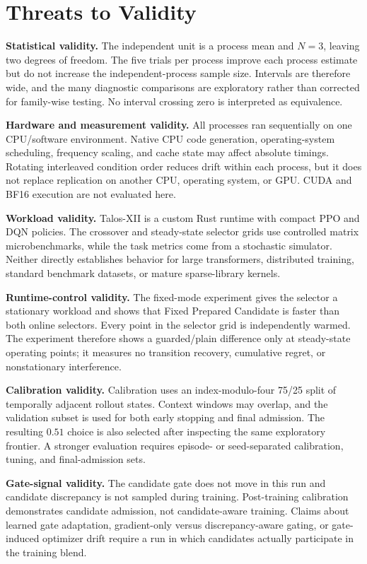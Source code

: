 \documentclass{article}
\begin{document}
\section{Threats to Validity}

\textbf{Statistical validity.}
The independent unit is a process mean and $N=3$, leaving two degrees of
freedom. The five trials per process improve each process estimate but do not
increase the independent-process sample size. Intervals are therefore wide,
and the many diagnostic comparisons are exploratory rather than corrected for
family-wise testing. No interval crossing zero is interpreted as equivalence.

\textbf{Hardware and measurement validity.}
All processes ran sequentially on one CPU/software environment. Native CPU
code generation, operating-system scheduling, frequency scaling, and cache
state may affect absolute timings. Rotating interleaved condition order reduces
drift within each process, but it does not replace replication on another CPU,
operating system, or GPU. CUDA and BF16 execution are not evaluated here.

\textbf{Workload validity.}
Talos-XII is a custom Rust runtime with compact PPO and DQN policies. The
crossover and steady-state selector grids use controlled matrix
microbenchmarks, while the
task metrics come from a stochastic simulator. Neither directly establishes
behavior for large transformers, distributed training, standard benchmark
datasets, or mature sparse-library kernels.

\textbf{Runtime-control validity.}
The fixed-mode experiment gives the selector a stationary workload and shows
that Fixed Prepared Candidate is faster than both online selectors. Every point
in the selector grid is independently warmed. The experiment therefore shows a
guarded/plain difference only at steady-state operating points; it measures no
transition recovery, cumulative regret, or nonstationary interference.

\textbf{Calibration validity.}
Calibration uses an index-modulo-four 75/25 split of temporally adjacent rollout
states. Context windows may overlap, and the validation subset is used for both
early stopping and final admission. The resulting $0.51$ choice is also selected
after inspecting the same exploratory frontier. A stronger evaluation requires
episode- or seed-separated calibration, tuning, and final-admission sets.

\textbf{Gate-signal validity.}
The candidate gate does not move in this run and candidate discrepancy is not
sampled during training. Post-training calibration demonstrates candidate
admission, not candidate-aware training. Claims about learned gate adaptation,
gradient-only versus discrepancy-aware gating, or gate-induced optimizer drift
require a run in which candidates actually participate in the training blend.
\end{document}
